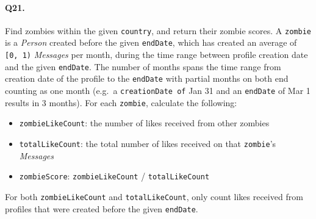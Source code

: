 \paragraph{Q21.}
Find zombies within the given \texttt{country}, and return their zombie
scores.
A \texttt{zombie} is a \emph{Person} created before the given
\texttt{endDate}, which has created an average of \texttt{{[}0,\ 1)}
\emph{Messages} per month, during the time range between profile
creation date and the given \texttt{endDate}. The number of months spans
the time range from creation date of the profile to the \texttt{endDate}
with partial months on both end counting as one month (e.g.~a
\texttt{creationDate\ of} Jan 31 and an \texttt{endDate} of Mar 1
results in 3 months).
For each \texttt{zombie}, calculate the following:
\begin{itemize}
\tightlist
\item
  \texttt{zombieLikeCount}: the number of likes received from other
  zombies
\item
  \texttt{totalLikeCount}: the total number of likes received on that
  \texttt{zombie}'s \emph{Messages}
\item
  \texttt{zombieScore}: \texttt{zombieLikeCount} /
  \texttt{totalLikeCount}
\end{itemize}
For both \texttt{zombieLikeCount} and \texttt{totalLikeCount}, only
count likes received from profiles that were created before the given
\texttt{endDate}.
